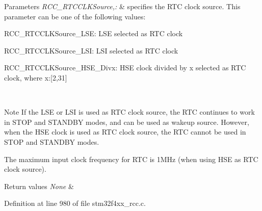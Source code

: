 \begin{DoxyParams}{Parameters}
{\em R\-C\-C\-\_\-\-R\-T\-C\-C\-L\-K\-Source,\-:} & specifies the R\-T\-C clock source. This parameter can be one of the following values\-: \begin{DoxyItemize}
\item R\-C\-C\-\_\-\-R\-T\-C\-C\-L\-K\-Source\-\_\-\-L\-S\-E\-: L\-S\-E selected as R\-T\-C clock \item R\-C\-C\-\_\-\-R\-T\-C\-C\-L\-K\-Source\-\_\-\-L\-S\-I\-: L\-S\-I selected as R\-T\-C clock \item R\-C\-C\-\_\-\-R\-T\-C\-C\-L\-K\-Source\-\_\-\-H\-S\-E\-\_\-\-Divx\-: H\-S\-E clock divided by x selected as R\-T\-C clock, where x\-:\mbox{[}2,31\mbox{]}\end{DoxyItemize}
\\
\hline
\end{DoxyParams}
\begin{DoxyNote}{Note}
If the L\-S\-E or L\-S\-I is used as R\-T\-C clock source, the R\-T\-C continues to work in S\-T\-O\-P and S\-T\-A\-N\-D\-B\-Y modes, and can be used as wakeup source. However, when the H\-S\-E clock is used as R\-T\-C clock source, the R\-T\-C cannot be used in S\-T\-O\-P and S\-T\-A\-N\-D\-B\-Y modes. 

The maximum input clock frequency for R\-T\-C is 1\-M\-Hz (when using H\-S\-E as R\-T\-C clock source).
\end{DoxyNote}

\begin{DoxyRetVals}{Return values}
{\em None} & \\
\hline
\end{DoxyRetVals}


Definition at line 980 of file stm32f4xx\-\_\-rcc.\-c.

